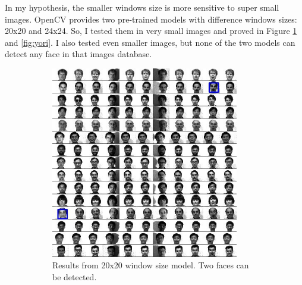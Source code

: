 \documentclass[10pt,twocolumn,letterpaper]{article}
\begin{document}
In my hypothesis, the smaller windows size is more sensitive to super small images.
OpenCV provides two pre-trained models with difference windows sizes: 20x20 and 24x24.
So, I tested them in very small images and proved in Figure \ref{fig:ysmall} and \ref{fig:yori}.
I also tested even smaller images, but none of the two models can detect any face in that images database.


\begin{figure}[t]
    \centering
    \begin{subfigure}[t]{0.45\textwidth}
        \begin{center}
            \includegraphics[width=0.9\textwidth]{yaleallsmall}
        \end{center}
        \caption{Results from 20x20 window size model. Two faces can be detected.}
        \label{fig:ysmall}
    \end{subfigure}
	~
    \begin{subfigure}[t]{0.45\textwidth}
        \begin{center}

\end{center}
\end{subfigure}
\end{figure}
\end{document}
